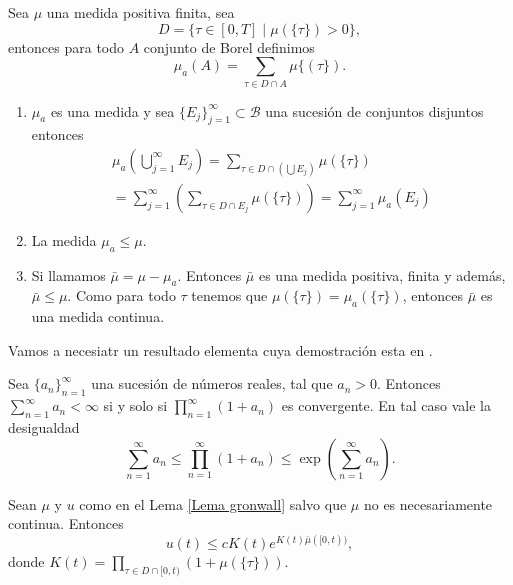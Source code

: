 \begin{defi}\label{mu_a}
	Sea $\mu$ una medida positiva finita, sea $$D=\{\tau\in[0,T] \mid \mu(\{\tau\})> 0\},$$ entonces para todo $A$ conjunto de Borel definimos $$\mu_a(A)=\sum_{\tau\in D\cap A}\mu\{(\tau\}).$$
\end{defi}

\begin{obs}
	\begin{enumerate}
		\item  $\mu_a$ es una medida y sea $\{E_j\}_{j=1}^\infty\subset \mathscr{B}$ una sucesión de conjuntos disjuntos entonces
		\begin{multline*}
			\mu_a \left( \bigcup_{j=1}^{\infty}E_j\right)= \sum_{\tau\in D\cap \left( \bigcup E_j\right)}\mu(\{\tau\})\\
   =\sum_{j=1}^{\infty}\left( \sum_{\tau\in D\cap E_j}\mu(\{\tau\}) \right) =\sum_{j=1}^{\infty}\mu_a(E_j)
		\end{multline*} 
	

\item La medida $\mu_a\leq\mu$.

\item  Si llamamos $\bar{\mu}=\mu-\mu_a$\index[Simbolo]{$\bar{\mu}$}. Entonces $\bar{\mu}$ es una medida positiva,  finita y además, $\bar{\mu}\leq \mu$. Como para todo $\tau$ tenemos que $\mu(\{\tau\})=\mu_a(\{\tau\})$, entonces $\bar{\mu}$ es una medida continua.
\end{enumerate}
\end{obs}

Vamos a necesiatr un resultado elementa cuya demostración esta en \cite[Teorema 8.1.1]{limits}.
\begin{thm}\label{limits}
	Sea $\{a_n\}_{n=1}^\infty$ una sucesión de números reales, tal que $a_n>0$. Entonces $\displaystyle\sum_{n=1}^{\infty}a_n<\infty$ si y solo si $\displaystyle\prod_{n=1}^\infty(1+a_n)$ es convergente.  En tal caso vale la desigualdad
	\begin{equation*}
	\sum_{n=1}^{\infty}a_n\leq \prod_{n=1}^\infty(1+a_n) \leq \exp\left(\sum_{n=1}^{\infty}a_n \right). 
	\end{equation*}
\end{thm}


\begin{thm} \label{TG} Sean $\mu$ y $u$ como en el Lema \ref{Lema gronwall} salvo que $\mu$ no es necesariamente continua. Entonces 
\begin{equation*}
	u(t)\leq c K(t)e^{K(t)\bar{\mu}([0,t))},
\end{equation*}
donde $K(t)=\displaystyle\prod_{\tau\in D\cap[0,t)}\left( 1+\mu(\{\tau\})\right) $.

\end{thm}

